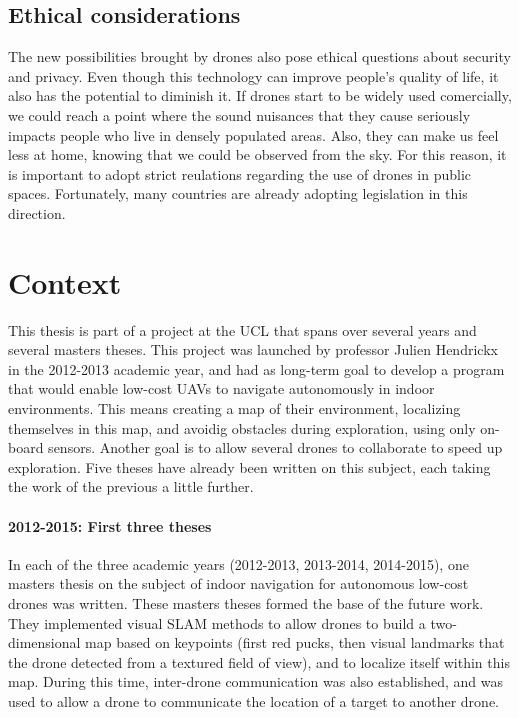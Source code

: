\subsection{Ethical considerations}
The new possibilities brought by drones also pose ethical questions about security and privacy. Even though this technology can improve people's quality of life, it also has the potential to diminish it. If drones start to be widely used comercially, we could reach a point where the sound nuisances that they cause seriously impacts people who live in densely populated areas. Also, they can make us feel less at home, knowing that we could be observed from the sky. For this reason, it is important to adopt strict reulations regarding the use of drones in public spaces. Fortunately, many countries are already adopting legislation in this direction.


\section{Context}
This thesis is part of a project at the UCL that spans over several years and several masters theses. This project was launched by professor Julien Hendrickx in the 2012-2013 academic year, and had as long-term goal to develop a program that would enable low-cost UAVs to navigate autonomously in indoor environments. This means creating a map of their environment, localizing themselves in this map, and avoidig obstacles during exploration, using only on-board sensors. Another goal is to allow several drones to collaborate to speed up exploration. Five theses have already been written on this subject, each taking the work of the previous a little further.
\paragraph{2012-2015: First three theses}
In each of the three academic years (2012-2013, 2013-2014, 2014-2015), one masters thesis on the subject of indoor navigation for autonomous low-cost drones was written. These masters theses formed the base of the future work. They implemented visual SLAM methods to allow drones to build a two-dimensional map based on keypoints (first red pucks, then visual landmarks that the drone detected from a textured field of view), and to localize itself within this map. During this time, inter-drone communication was also established, and was used to allow a drone to communicate the location of a target to another drone.

